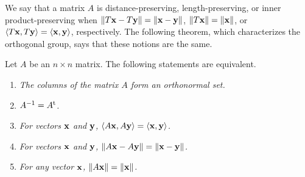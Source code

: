  
We say that a matrix $A$ is {\bfi
distance-preserving}, {\bfi
length-preserving}, or {\bfi inner
product-preserving\/} when $\|
T{\bold x}- T{\bold y} \| =\| {\bold x}- {\bold y} \|$, $\| T{\bold x}
\| =\| {\bold x} \|$, or $\langle  T{\bold x}, T{\bold y} \rangle =
\langle {\bold x},{\bold y} \rangle$, respectively. The following
theorem, which characterizes the orthogonal group, says that these
notions are the same.
 
 
\begin{theorem}
Let $A$ be an $n \times n$ matrix.  The following statements are
equivalent. 
\begin{enumerate}
 
\rm \item \it
The columns of the matrix $A$ form an orthonormal set.
 
\rm \item \it
$A^{-1} = A^{\rm t}$.
 
\rm \item \it
For vectors ${\bold x}$ and ${\bold y}$, $\langle  A{\bold x}, A
{\bold y} \rangle = \langle  {\bold x}, {\bold y} \rangle$.
 
\rm \item \it
For vectors ${\bold x}$ and ${\bold y}$, $\| A{\bold x}- A{\bold y} \|
=\| {\bold x}- {\bold y} \|$. 
 
\rm \item \it
For any vector ${\bold x}$, $\| A{\bold x} \| = \| {\bold x}\|$.
 
\end{enumerate}
\end{theorem}
 
